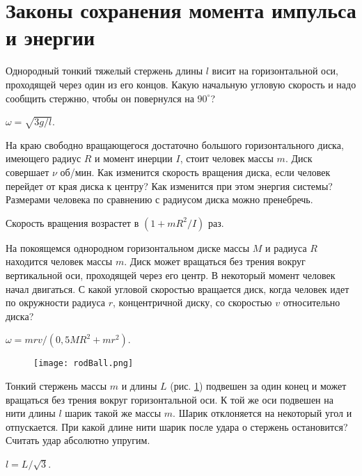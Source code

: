 \section{Законы сохранения момента импульса и энергии}

\introProblems

\begin{ex} %
Однородный тонкий тяжелый стержень длины $l$ висит на горизонтальной оси, проходящей через один из его концов. Какую начальную угловую скорость и надо сообщить стержню, чтобы он повернулся на $90^{\circ}$?
\begin{ans}
$\omega = \sqrt{3g/l}$.
\end{ans}
\end{ex}	

\begin{ex} %
На краю свободно вращающегося достаточно большого горизонтального диска, имеющего радиус $R$ и момент инерции $I$, стоит человек массы $m$. Диск совершает $\nu$ об/мин. Как изменится скорость вращения диска, если человек перейдет от края диска к центру? Как изменится при этом энергия системы? Размерами человека по сравнению с радиусом диска можно пренебречь.
\begin{ans}
Скорость вращения возрастет в $(1+mR^2/I)$ раз.
\end{ans}
\end{ex}	

\begin{ex} %
На покоящемся однородном горизонтальном диске массы $M$ и радиуса $R$ находится человек массы $m$. Диск может вращаться без трения вокруг вертикальной оси, проходящей через его центр. В некоторый момент человек начал двигаться. С какой угловой скоростью вращается диск, когда человек идет по окружности радиуса $r$, концентричной диску, со скоростью $v$ относительно диска?
\begin{ans}
$\omega = mrv/(0,5MR^2 + mr^2)$.
\end{ans}
\end{ex}	

\begin{figure}[h]
\centering
\texttt{[image: rodBall.png]}
\caption{}
\label{rodBall}
\end{figure}

\begin{ex} %
Тонкий стержень массы $m$ и длины $L$ (рис. \ref{rodBall}) подвешен за один конец и может вращаться без трения вокруг горизонтальной оси. К той же оси подвешен на нити длины $l$ шарик такой же массы $m$. Шарик отклоняется на некоторый угол и отпускается. При какой длине нити шарик после удара о стержень остановится? Считать удар абсолютно упругим.
\begin{ans}
$l = L/\sqrt{3}$.
\end{ans}
\end{ex}	

